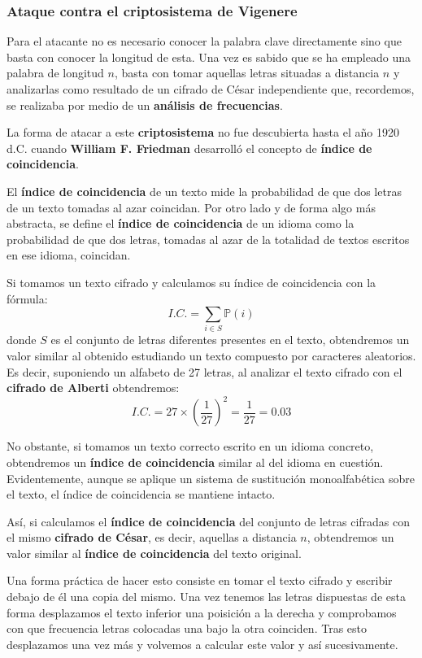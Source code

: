 \documentclass[nochap]{apuntesURJC}
\begin{document}
\subsubsection{Ataque contra el criptosistema de Vigenere}
Para el atacante no es necesario conocer la palabra clave directamente sino que basta con conocer la longitud de esta. Una vez es sabido que se ha empleado una palabra de longitud $n$, basta con tomar aquellas letras situadas a distancia $n$ y analizarlas como resultado de un cifrado de César independiente que, recordemos, se realizaba por medio de un \textbf{análisis de frecuencias}.

La forma de atacar a este \textbf{criptosistema} no fue descubierta hasta el año 1920 d.C. cuando \textbf{William F. Friedman} desarrolló el concepto de \textbf{índice de coincidencia}.

El \textbf{índice de coincidencia} de un texto mide la probabilidad de que dos letras de un texto tomadas al azar coincidan. Por otro lado y de forma algo más abstracta, se define el \textbf{índice de coincidencia} de un idioma como la probabilidad de que dos letras, tomadas al azar de la totalidad de textos escritos en ese idioma, coincidan.

Si tomamos un texto cifrado y calculamos su índice de coincidencia con la fórmula:
\[I.C. = \sum_{i \in S}\mathbb{P}(i)\]
donde $S$ es el conjunto de letras diferentes presentes en el texto, obtendremos un valor similar al obtenido estudiando un texto compuesto por caracteres aleatorios. Es decir, suponiendo un alfabeto de 27 letras, al analizar el texto cifrado con el \textbf{cifrado de Alberti} obtendremos:
\[I.C. = 27 \times \left(\frac{1}{27}\right)^2 = \frac{1}{27} = 0.03\]

No obstante, si tomamos un texto correcto escrito en un idioma concreto, obtendremos un \textbf{índice de coincidencia} similar al del idioma en cuestión. Evidentemente, aunque se aplique un sistema de sustitución monoalfabética sobre el texto, el índice de coincidencia se mantiene intacto.

Así, si calculamos el \textbf{índice de coincidencia} del conjunto de letras cifradas con el mismo \textbf{cifrado de César}, es decir, aquellas a distancia $n$, obtendremos un valor similar al \textbf{índice de coincidencia} del texto original.

Una forma práctica de hacer esto consiste en tomar el texto cifrado y escribir debajo de él una copia del mismo. Una vez tenemos las letras dispuestas de esta forma desplazamos el texto inferior una poisición a la derecha y comprobamos con que frecuencia letras colocadas una bajo la otra coinciden. Tras esto desplazamos una vez más y volvemos a calcular este valor y así sucesivamente.
\end{document}
